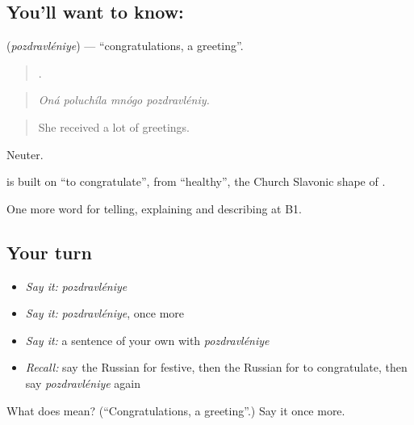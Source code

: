\subsection*{You'll want to know: }
\textbf{} (\emph{pozdravléniye}) — \textquotedblleft{}congratulations, a greeting\textquotedblright{}.

\begin{quote}
   .
\end{quote}

\begin{quote}
\emph{Oná poluchíla mnógo pozdravléniy.}
\end{quote}

\begin{quote}
She received a lot of greetings.
\end{quote}

Neuter.

\begin{cousinweb}
\emph{} is built on \emph{} \textquotedblleft{}to congratulate\textquotedblright{}, from \emph{} \textquotedblleft{}healthy\textquotedblright{}, the Church Slavonic shape of \emph{}.
\end{cousinweb}

\begin{grammarlens}[title={What you've built}]
One more word for telling, explaining and describing at B1.
\end{grammarlens}

\subsection*{Your turn}
\begin{itemize}
\raggedright
  \item \emph{Say it:} \emph{pozdravléniye}
  \item \emph{Say it:} \emph{pozdravléniye}, once more
  \item \emph{Say it:} a sentence of your own with \emph{pozdravléniye}
  \item \emph{Recall:} say the Russian for festive, then the Russian for to congratulate, then say \emph{pozdravléniye} again
\end{itemize}

\begin{tcolorbox}[breakable,colback=teal!4,colframe=teal!35!black,title={Before you move on}]
What does  mean? (\textquotedblleft{}Congratulations, a greeting\textquotedblright{}.) Say it once more.
\end{tcolorbox}
